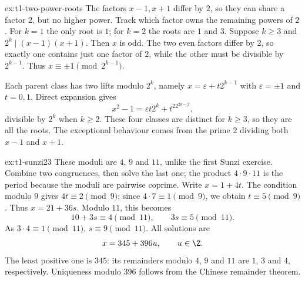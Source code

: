 \begin{solution}{ex:t1-two-power-roots}
\idea The factors $x-1,x+1$ differ by $2$, so they can share a factor $2$, but no higher power. Track which factor owns the remaining powers of $2$.
\writeup For $k=1$ the only root is $1$; for $k=2$ the roots are $1$ and $3$. Suppose $k\ge3$ and $2^k\mid(x-1)(x+1)$. Then $x$ is odd. The two even factors differ by $2$, so exactly one contains just one factor of $2$, while the other must be divisible by $2^{k-1}$. Thus $x\equiv\pm1\pmod{2^{k-1}}$.

Each parent class has two lifts modulo $2^k$, namely $x=\varepsilon+t2^{k-1}$ with $\varepsilon=\pm1$ and $t=0,1$. Direct expansion gives
\[
x^2-1=\varepsilon t2^k+t^22^{2k-2},
\]
divisible by $2^k$ when $k\ge2$. These four classes are distinct for $k\ge3$, so they are all the roots. The exceptional behaviour comes from the prime $2$ dividing both $x-1$ and $x+1$.
\end{solution}

\begin{solution}{ex:t1-sunzi23}
\idea These moduli are $4$, $9$ and $11$, unlike the first Sunzi exercise. Combine two congruences, then solve the last one; the product $4\cdot9\cdot11$ is the period because the moduli are pairwise coprime.
\writeup Write $x=1+4t$. The condition modulo $9$ gives $4t\equiv2\pmod9$; since $4\cdot7\equiv1\pmod9$, we obtain $t\equiv5\pmod9$. Thus $x=21+36s$. Modulo $11$, this becomes
\[
10+3s\equiv4\pmod{11},
\qquad 3s\equiv5\pmod{11}.
\]
As $3\cdot4\equiv1\pmod{11}$, $s\equiv9\pmod{11}$. All solutions are
\[
x=345+396u,\qquad u\in\Z.
\]
The least positive one is $345$: its remainders modulo $4$, $9$ and $11$ are $1$, $3$ and $4$, respectively. Uniqueness modulo $396$ follows from the Chinese remainder theorem.
\end{solution}

